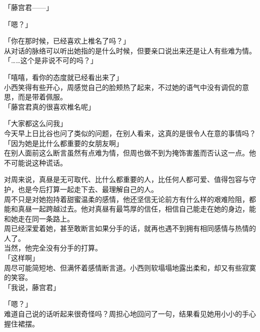 「藤宫君——」

「嗯？」

「你在那时候，已经喜欢上椎名了吗？」\\

从对话的脉络可以听出她指的是什么时候，但要亲口说出来还是让人有些难为情。\\

「……这个是非说不可的吗？」

「嘻嘻，看你的态度就已经看出来了」\\

小西笑得有些开心，周感觉自己的脸颊热了起来，不过她的语气中没有调侃的意思，而是带着佩服。\\

「藤宫君真的很喜欢椎名呢」

「大家都这么问我」\\

今天早上日比谷也问了类似的问题，在别人看来，这真的是很令人在意的事情吗？\\

「因为她是比什么都重要的女朋友啊」\\

在别人面前这么断言虽然有点难为情，但周也做不到为掩饰害羞而否认这一点。他不可能说这种谎话。

对周来说，真昼是无可取代、比什么都重要的人，比任何人都可爱、值得包容与守护，也是今后打算一起走下去、最理解自己的人。\\

周不只是对她抱持着甜蜜温柔的感情，他还坚信无论前方有什么样的艰难险阻，都能和真昼一起跨越过去。他对真昼有最笃厚的信任，相信自己能走在她的身边，能和她走在同一条路上。\\

周已经深爱着她，甚至敢断言如果分手的话，就再也遇不到拥有相同感情与热情的人了。\\

当然，他完全没有分手的打算。\\

「这样啊」\\

周尽可能简短地、但满怀着感情断言道。小西则软塌塌地露出柔和，却又有些寂寞的笑容。\\

「我说，藤宫君」

「嗯？」\\

难道自己说的话听起来很奇怪吗？周担心地回问了一句，结果看见她用小小的手心握住裙摆。\\

